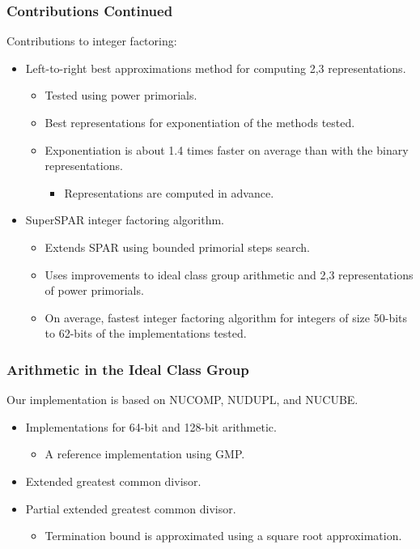 \documentclass{beamer}
\begin{document}
\begin{frame}
\frametitle{Contributions Continued}
Contributions to integer factoring:

\begin{itemize}
\item Left-to-right best approximations method for computing 2,3 representations.
	\begin{itemize}
	\item Tested using power primorials.
	\item Best representations for exponentiation of the methods tested.
	\item Exponentiation is about 1.4 times faster on average than with the binary representations.
		\begin{itemize}
		\item Representations are computed in advance.
		\end{itemize}
	\end{itemize}
\item SuperSPAR integer factoring algorithm.
	\begin{itemize}
	\item Extends SPAR using bounded primorial steps search.
	\item Uses improvements to ideal class group arithmetic and 2,3 representations of power primorials.
	\item On average, fastest integer factoring algorithm for integers of size 50-bits to 62-bits of the implementations tested.
	\end{itemize}
\end{itemize}
\end{frame}
  
\begin{frame}
\frametitle{Arithmetic in the Ideal Class Group}
Our implementation is based on NUCOMP, NUDUPL, and NUCUBE. %

\begin{itemize}
\item Implementations for 64-bit and 128-bit arithmetic.
	\begin{itemize}
	\item A reference implementation using GMP.
	\end{itemize}
\item Extended greatest common divisor.
\item Partial extended greatest common divisor.
	\begin{itemize}
	\item Termination bound is approximated using a square root approximation.
	\end{itemize}
\end{itemize}

\end{frame}  
\end{document}
